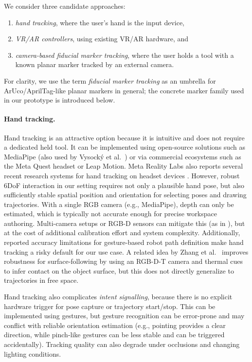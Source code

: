 We consider three candidate approaches:
\begin{enumerate}[label=(\roman*), itemsep=0.2em]
    \item \emph{hand tracking}, where the user's hand is the input device,
    \item \emph{VR/AR controllers}, using existing VR/AR hardware, and
    \item \emph{camera-based fiducial marker tracking}, where the user holds a tool with a known planar marker tracked by an external camera.
\end{enumerate}

For clarity, we use the term \emph{fiducial marker tracking} as an umbrella for ArUco/AprilTag-like planar markers in general; the concrete marker family used in our prototype is introduced below.

\paragraph{Hand tracking.}
Hand tracking is an attractive option because it is intuitive and does not require a dedicated held tool. It can be implemented using open-source solutions such as MediaPipe \cite{MediaPipeRoot} (also used by Vysocký et al.\ \cite{Vysocky2023}) or via commercial ecosystems such as the Meta Quest headset or Leap Motion. Meta Reality Labs also reports several recent research systems for hand tracking on headset devices \cite{FB_research, FB__UmeTrack, FB__MEgATrack, FB__ElasticHandTrack}.
However, robust 6DoF interaction in our setting requires not only a plausible hand pose, but also sufficiently stable spatial position and orientation for selecting poses and drawing trajectories. With a single RGB camera (e.g., MediaPipe), depth can only be estimated, which is typically not accurate enough for precise workspace authoring. Multi-camera setups or RGB-D sensors can mitigate this (as in \cite{Vysocky2023}), but at the cost of additional calibration effort and system complexity. Additionally, reported accuracy limitations for gesture-based robot path definition \cite{Vysocky2023} make hand tracking a risky default for our use case.
A related idea by Zhang et al.\ \cite{Zhang2023} improves robustness for surface-following by using an RGB-D-T camera and thermal cues to infer contact on the object surface, but this does not directly generalize to trajectories in free space.

Hand tracking also complicates \emph{intent signalling}, because there is no explicit hardware trigger for pose capture or trajectory start/stop. This can be implemented using gestures, but gesture recognition can be error-prone and may conflict with reliable orientation estimation (e.g., pointing provides a clear direction, while pinch-like gestures can be less stable and can be triggered accidentally). Tracking quality can also degrade under occlusions and changing lighting conditions.

